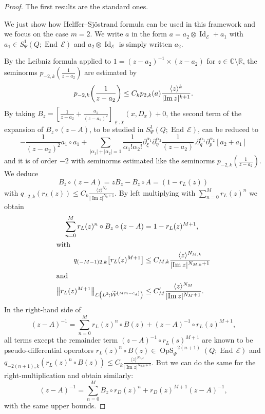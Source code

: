 \documentclass[AHL,Unicode,longabstracts]{cedram}
\newcommand{\C}{\mathbb{C}}
\newcommand{\R}{\mathbb{R}}
\newcommand{\clW}{\mathcal{W}}
\newcommand{\clE}{\mathcal{E}}
\newcommand{\clL}{\mathcal{L}}
\DeclareMathOperator{\End}{End}
\DeclareMathOperator{\OpS}{OpS}
\DeclareMathOperator{\Idd}{Id}
\DeclareMathOperator{\Imm}{Im}
\let\originalleft\left
\let\originalright\right
\renewcommand{\left}{\mathopen{}\mathclose\bgroup\originalleft}
\renewcommand{\right}{\aftergroup\egroup\originalright}
\begin{document}
\begin{proof}
The first results are the standard ones.

We just show how Helffer--Sj\"ostrand formula can be used in this framework and we focus on the case $m=2$. We write $a$ in the form $a=a_{2}\otimes\Idd_{\clE}+a_{1}$ with $a_{1}\in S^{1}_{\Psi}(Q;\End\,\clE)$ and $a_{2}\otimes \Idd_{\clE}$ is simply written $a_{2}$.

By the Leibniz formula applied to $1=(z-a_{2})^{-1}\times(z-a_{2})$ for $z\in \C\setminus \R$, the seminorms $p_{-2,k}(\frac{1}{z-a_{2}})$ are estimated by
\[
p_{-2,k}\left(\frac{1}{z-a_{2}}\right)\leq C_{k}p_{2,k}(a) \frac{\langle z\rangle^{k}}{\lvert\Imm z|^{k+1}}.
\]
By taking $B_{z}=[\frac{1}{z-a_{2}}+\frac{a_{1}}{(z-a_{2})^{2}}]_{\varrho,\chi}(x,D_{x})+0$, the second term of the expansion of $B_{z}\circ (z-A)$, to be studied in $S^{1}_{\Psi}(Q;\End\,\clE)$, can be reduced to
\[
-\frac{1}{(z-a_{2})^{2}}a_{1}\circ a_{1}+
\sum_{|\alpha_{1}|+|\alpha_{2}|= 1}\frac{1}{\alpha_{1}!\alpha_{2}!}\partial_{\xi}^{\alpha_{1}}\partial_{\eta}^{\alpha_{2}}\frac{1}{(z-a_{2})}.\partial_{q}^{\alpha_{1}}\partial_{p}^{\alpha_{2}}[a_{2}+a_{1}]
\]
and it is of order $-2$ with seminorms estimated like the seminorms $p_{-2,k}(\frac{1}{z-a_{2}})$. We deduce
\[
B_{z}\circ (z-A)=zB_{z} -B_{z}\circ A= (1-r_{L}(z))
\]
with $q_{-2,k}(r_{L}(z))\leq C_{k}\frac{\langle z\rangle^{N_{k}}}{\lvert\Imm z|^{N_{k}+1}}$. By left multiplying with $\sum_{n=0}^{M}r_{L}(z)^{n}$ we obtain
\begin{align*}
\sum_{n=0}^{M}r_{L}(z)^{n}\circ B_{z}\circ (z-A)&=1-r_{L}(z)^{M+1},
\\
\intertext{with}
q_{(-M-1)2,k}\left[r_{L}(z)^{M+1}\right]&\leq C_{M,k}\frac{\langle z\rangle^{N_{M,k}}}{\lvert\Imm z|^{N_{M,k}+1}}\\
\intertext{and}
\left\|r_{L}(z)^{M+1}\right\|_{\clL\left(L^{2};\widetilde{\clW}^{\left(Mm-c_{d}\right)}\right)}&\leq C'_{M}\frac{\langle z\rangle^{N_{M}}}{\lvert\Imm z|^{N_{M}+1}}.
\end{align*}
In the right-hand side of
\[
(z-A)^{-1}=\sum_{n=0}^{M}r_{L}(z)^{n}\circ B(z)+(z-A)^{-1}\circ r_{L}(z)^{M+1},
\]
all terms except the remainder term $(z-A)^{-1}\circ r_{L}(s)^{M+1}$ are known to be pseudo-differential operators $r_{L}(z)^{n}\circ B(z)\in \OpS^{-2(n+1)}_{\Psi}(Q;\End\,\clE)$ and $q_{-2(n+1),k}(r_{L}(z)^{n}\circ B(z))\leq C_{k}\frac{\langle z\rangle^{N_{n,k}}}{\lvert\Imm z|^{N_{n,k}+1}}$. But we can do the same for the right-multiplication and obtain similarly:
\[
(z-A)^{-1}=\sum_{n=0}^{M}B_{z}\circ r_{D}(z)^{n}+r_{D}(z)^{M+1}(z-A)^{-1},
\]
with the same upper bounds.


\end{proof}
\end{document}
